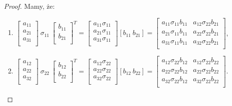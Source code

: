 \documentclass[12pt,a4paper]{report}
\begin{document}
\begin{proof}
Mamy, że:
\begin{enumerate}
\item
$\left[ \begin{array}{c}
         a_{11} \\
         a_{21} \\
         a_{31} \\
         \end{array}
      \right] \: \sigma_{11} \: \left[ \begin{array}{c}
         b_{11} \\
         b_{21} \\
         \end{array}
      \right]^T = \left[
        \begin{array}{c}
         a_{11} \sigma_{11} \\
         a_{21} \sigma_{11} \\
         a_{31} \sigma_{11} \\
         \end{array}
      \right] [b_{11} \: b_{21}] =  \left[
        \begin{array}{cc}
         a_{11} \sigma_{11} b_{11}  & a_{12} \sigma_{22} b_{21}\\
         a_{21} \sigma_{11} b_{11} & a_{22} \sigma_{22} b_{21} \\
         a_{31} \sigma_{11} b_{11} & a_{32} \sigma_{22} b_{21} \\
         \end{array}
      \right] $,
\item
$\left[ \begin{array}{c}
         a_{12} \\
         a_{22} \\
         a_{32} \\
         \end{array}
      \right] \: \sigma_{22} \: \left[ \begin{array}{c}
         b_{12} \\
         b_{22} \\
         \end{array}
      \right]^T = \left[
        \begin{array}{c}
         a_{12} \sigma_{22} \\
         a_{22} \sigma_{22} \\
         a_{32} \sigma_{22} \\
         \end{array}
      \right] [b_{12} \: b_{22}] =  \left[
        \begin{array}{cc}
         a_{12} \sigma_{22} b_{12}  & a_{12} \sigma_{22} b_{22}\\
         a_{22} \sigma_{22} b_{12} & a_{22} \sigma_{22} b_{22} \\
         a_{32} \sigma_{22} b_{12} & a_{32} \sigma_{22} b_{22} \\
         \end{array}
      \right]. $
\end{enumerate}


\end{proof}
\end{document}
